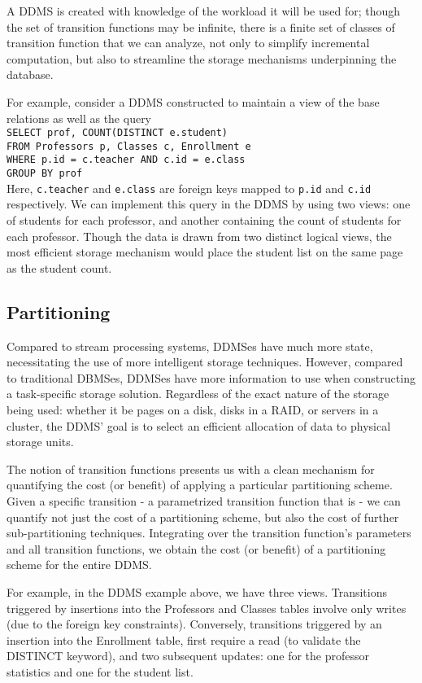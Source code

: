 A DDMS is created with knowledge of the workload it will be used for; though the set of transition functions may be infinite, there is a finite set of classes of transition function that we can analyze, not only to simplify incremental computation, but also to streamline the storage mechanisms underpinning the database.

For example, consider a DDMS constructed to maintain a view of the base relations as well as the query\texttt{\\
SELECT prof, COUNT(DISTINCT e.student)\\
FROM Professors p, Classes c, Enrollment e\\
WHERE p.id = c.teacher AND c.id = e.class\\
GROUP BY prof\\
}
Here, \texttt{c.teacher} and \texttt{e.class} are foreign keys mapped to \texttt{p.id} and \texttt{c.id} respectively.  We can implement this query in the DDMS by using two views: one of students for each professor, and another containing the count of students for each professor.  Though the data is drawn from two distinct logical views, the most efficient storage mechanism would place the student list on the same page as the student count.

\subsection{Partitioning}
Compared to stream processing systems, DDMSes have much more state, necessitating the use of more intelligent storage techniques.  However, compared to traditional DBMSes, DDMSes have more information to use when constructing a task-specific storage solution.  Regardless of the exact nature of the storage being used: whether it be pages on a disk, disks in a RAID, or servers in a cluster, the DDMS' goal is to select an efficient allocation of data to physical storage units.

The notion of transition functions presents us with a clean mechanism for quantifying the cost (or benefit) of applying a particular partitioning scheme.  Given a specific transition - a parametrized transition function that is - we can quantify not just the cost of a partitioning scheme, but also the cost of further sub-partitioning techniques.  Integrating over the transition function's parameters and all transition functions, we obtain the cost (or benefit) of a partitioning scheme for the entire DDMS.  

For example, in the DDMS example above, we have three views.  Transitions triggered by insertions into the Professors and Classes tables involve only writes (due to the foreign key constraints).  Conversely, transitions triggered by an insertion into the Enrollment table, first require a read (to validate the DISTINCT keyword), and two subsequent updates: one for the professor statistics and one for the student list.

